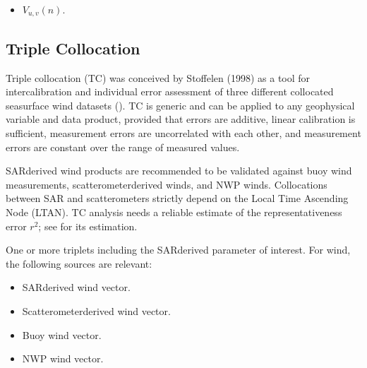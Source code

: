 \documentclass[a4paper,10pt,english]{sphinxmanual}
\begin{document}
\sphinxAtStartPar
{}
\begin{itemize}
\item {} 
\sphinxAtStartPar
\(V_{u,v}(n)\).

\end{itemize}


\subsection{Triple Collocation}
\label{\detokenize{alg-02-validation:triple-collocation}}
\sphinxAtStartPar
{}

\sphinxAtStartPar
Triple collocation (TC) was conceived by Stoffelen (1998) as a tool for
inter\sphinxhyphen{}calibration and individual error assessment of three different
collocated sea\sphinxhyphen{}surface wind datasets
({\hyperref[\detokenize{alg-02-validation:ref-stoffelen-triple-collocation}]{}}). TC is generic
and can be applied to any geophysical variable and data product, provided that
errors are additive, linear calibration is sufficient, measurement errors are
uncorrelated with each other, and measurement errors are constant over the
range of measured values.

\sphinxAtStartPar
SAR\sphinxhyphen{}derived wind products are recommended to be validated against buoy wind
measurements, scatterometer\sphinxhyphen{}derived winds, and NWP winds. Collocations between
SAR and scatterometers strictly depend on the Local Time Ascending Node (LTAN).
TC analysis needs a reliable estimate of the representativeness error
\(r^2\); see {\hyperref[\detokenize{alg-02-validation:spatial-variance}]{}} for its estimation.

\sphinxAtStartPar
{}

\sphinxAtStartPar
One or more triplets including the SAR\sphinxhyphen{}derived parameter of interest. For wind,
the following sources are relevant:
\begin{itemize}
\item {} 
\sphinxAtStartPar
SAR\sphinxhyphen{}derived wind vector.

\item {} 
\sphinxAtStartPar
Scatterometer\sphinxhyphen{}derived wind vector.

\item {} 
\sphinxAtStartPar
Buoy wind vector.

\item {} 
\sphinxAtStartPar
NWP wind vector.

\end{itemize}
\end{document}
